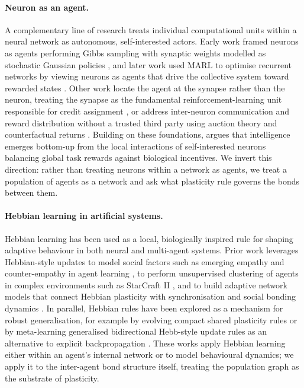 \documentclass{article}
\theoremstyle{plain}
\theoremstyle{definition}
\theoremstyle{remark}
\begin{document}
\paragraph{Neuron as an agent.} A complementary line of research treats individual computational units within a neural network as autonomous, self-interested actors. Early work framed neurons as agents performing Gibbs sampling with synaptic weights modelled as stochastic Gaussian policies \cite{wang2015reinforcement}, and later work used MARL to optimise recurrent networks by viewing neurons as agents that drive the collective system toward rewarded states \cite{chalk2019training}. Other work locate the agent at the synapse rather than the neuron, treating the synapse as the fundamental reinforcement-learning unit responsible for credit assignment \cite{bhargava2022gradient}, or address inter-neuron communication and reward distribution without a trusted third party using auction theory and counterfactual returns \cite{ohsawa2018neuron}. Building on these foundations, \cite{ott2020giving} argues that intelligence emerges bottom-up from the local interactions of self-interested neurons balancing global task rewards against biological incentives. We invert this direction: rather than treating neurons within a network as agents, we treat a population of agents as a network and ask what plasticity rule governs the bonds between them.

\paragraph{Hebbian learning in artificial systems.} Hebbian learning has been used as a local, biologically inspired rule for shaping adaptive behaviour in both neural and multi-agent systems. Prior work leverages Hebbian-style updates to model social factors such as emerging empathy and counter-empathy in agent learning \cite{chen2019reaching}, to perform unsupervised clustering of agents in complex environments such as StarCraft II \cite{kang2023forecasting}, and to build adaptive network models that connect Hebbian plasticity with synchronisation and social bonding dynamics \cite{mukeriia2024multi}. In parallel, Hebbian rules have been explored as a mechanism for robust generalisation, for example by evolving compact shared plasticity rules \cite{pedersen2021evolving} or by meta-learning generalised bidirectional Hebb-style update rules as an alternative to explicit backpropagation \cite{sandler2021meta}. These works apply Hebbian learning either within an agent's internal network or to model behavioural dynamics; we apply it to the inter-agent bond structure itself, treating the population graph as the substrate of plasticity.
\end{document}
